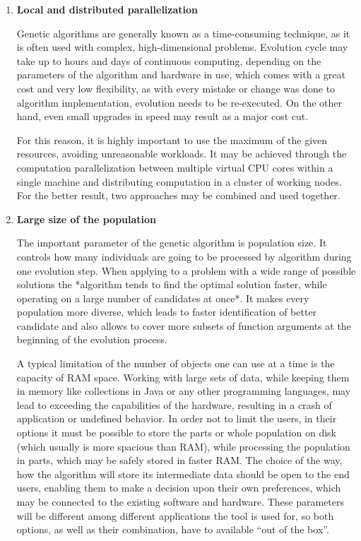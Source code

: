 \begin{enumerate}
\item
\textbf{Local and distributed parallelization}

Genetic algorithms are generally known as a time-consuming technique, as it is often used with complex, high-dimensional problems. Evolution cycle may take up to hours and days of continuous computing, depending on the parameters of the algorithm and hardware in use, which comes with a great cost and very low flexibility, as with every mistake or change was done to algorithm implementation, evolution needs to be re-executed. On the other hand, even small upgrades in speed may result as a major cost cut.

For this reason, it is highly important to use the maximum of the given resources, avoiding unreasonable workloads. It may be achieved through the computation parallelization between multiple virtual CPU cores within a single machine and distributing computation in a cluster of working nodes. For the better result, two approaches may be combined and used together.
\\

\item 
\textbf{Large size of the population}

The important parameter of the genetic algorithm is population size. It controls how many individuals are going to be processed by algorithm during one evolution step. When applying to a problem with a wide range of possible solutions the *algorithm tends to find the optimal solution faster, while operating on a large number of candidates at once*. It makes every population more diverse, which leads to faster identification of better candidate and also allows to cover more subsets of function arguments at the beginning of the evolution process.

A typical limitation of the number of objects one can use at a time is the capacity of RAM space. Working with large sets of data, while keeping them in memory like collections in Java or any other programming languages, may lead to exceeding the capabilities of the hardware, resulting in a crash of application or undefined behavior. In order not to limit the users, in their options it must be possible to store the parts or whole population on disk (which usually is more spacious than RAM), while processing the population in parts, which may be safely stored in faster RAM. The choice of the way, how the algorithm will store its intermediate data should be open to the end users, enabling them to make a decision upon their own preferences, which may be connected to the existing software and hardware. These parameters will be different among different applications the tool is used for, so both options, as well as their combination, have to available ``out of the box''.
\\


\end{enumerate}
